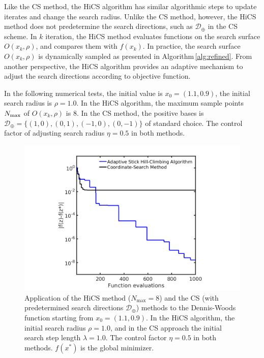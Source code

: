 \documentclass[final,1p,times]{elsarticle}
\begin{document}
Like the CS method, the HiCS algorithm
has similar algorithmic steps to update iterates and change
the search radius. Unlike the CS method, however, the HiCS
method does not predetermine the search
directions, such as $\mathcal{D}_{\oplus}$ in the CS scheme. 
In $k$ iteration, the HiCS method evaluates functions on the search
surface $O(x_k, \rho)$, and compares them with $f(x_k)$.
In practice, the search surface $O(x_k, \rho)$ is
dynamically sampled as presented in Algorithm\,\ref{alg:refined}.
From another perspective, the HiCS algorithm
provides an adaptive mechanism to adjust the search directions 
according to objective function. 

In the following numerical tests, the initial value is $x_0=(1.1,
0.9)$, the initial search radius is $\rho = 1.0$.
In the HiCS algorithm, the maximum sample points $N_{\rm{max}}$
of $O(x_k, \rho)$ is $8$. In the CS method, the positive bases is
$\mathcal{D}_{\oplus}=\{(1,0), (0,1), (-1,0), (0,-1)\}$ of standard choice.
The control factor of adjusting search radius $\eta=0.5$ in both methods. 
\begin{figure}[!htbp]
	\centering
	  \includegraphics[scale=0.35]{../figures/dwoods_cmp.png}
	  \caption{Application of the HiCS method
	  ($N_{\max}=8$) and the CS (with predetermined search
	  directions $\mathcal{D}_\oplus$) methods to the
	  Dennis-Woods function starting from $x_0=(1.1, 0.9)$. In
	  the HiCS algorithm, the initial search
	  radius $\rho = 1.0$, and in the CS approach the initial
	  search step length $\lambda=1.0$.  The control factor
	  $\eta=0.5$ in both methods. $f(x^*)$ is the global
	  minimizer.}
\label{fig:dwfun:cmp}
\end{figure}
\end{document}
